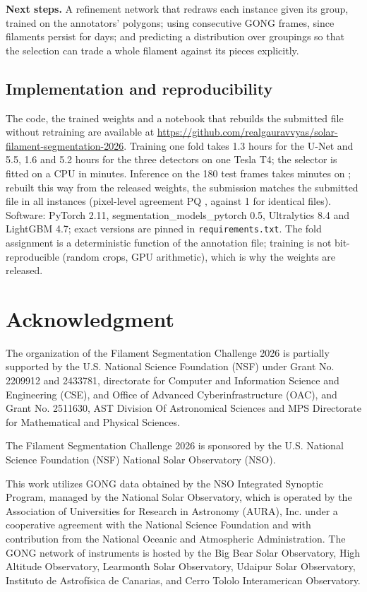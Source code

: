 \documentclass[sigconf]{acmart}
\begin{document}
    \textbf{Next steps.} A refinement network that redraws each instance given its group, trained on the annotators' polygons; using consecutive GONG frames, since filaments persist for days; and predicting a distribution over groupings so that the selection can trade a whole filament against its pieces explicitly.

\subsection{Implementation and reproducibility}
    The code, the trained weights and a notebook that rebuilds the submitted file without retraining are available at \url{https://github.com/realgauravvyas/solar-filament-segmentation-2026}. Training one fold takes 1.3 hours for the U-Net and 5.5, 1.6 and 5.2 hours for the three detectors on one Tesla T4; the selector is fitted on a CPU in minutes. Inference on the 180 test frames takes \inferenceMinutes{} minutes on \inferenceGpu{}; rebuilt this way from the released weights, the submission matches the submitted file in all \reproInstances{} instances (pixel-level agreement PQ \reproAgreement{}, against 1 for identical files). Software: PyTorch 2.11, segmentation\_models\_pytorch 0.5, Ultralytics 8.4 and LightGBM 4.7; exact versions are pinned in \texttt{requirements.txt}. The fold assignment is a deterministic function of the annotation file; training is not bit-reproducible (random crops, GPU arithmetic), which is why the weights are released.

\section{Acknowledgment}\label{sec:acknowledgment}
    The organization of the Filament Segmentation Challenge 2026 is partially supported by the U.S. National Science Foundation (NSF) under Grant No. 2209912 and 2433781, directorate for Computer and Information Science and Engineering (CSE), and Office of Advanced Cyberinfrastructure (OAC), and Grant No. 2511630, AST Division Of Astronomical Sciences and MPS Directorate for Mathematical and Physical Sciences.

    The Filament Segmentation Challenge 2026 is sponsored by the U.S. National Science Foundation (NSF) National Solar Observatory (NSO).

    This work utilizes GONG data obtained by the NSO Integrated Synoptic Program, managed by the National Solar Observatory, which is operated by the Association of Universities for Research in Astronomy (AURA), Inc. under a cooperative agreement with the National Science Foundation and with contribution from the National Oceanic and Atmospheric Administration. The GONG network of instruments is hosted by the Big Bear Solar Observatory, High Altitude Observatory, Learmonth Solar Observatory, Udaipur Solar Observatory, Instituto de Astrofísica de Canarias, and Cerro Tololo Interamerican Observatory.



\end{document}
